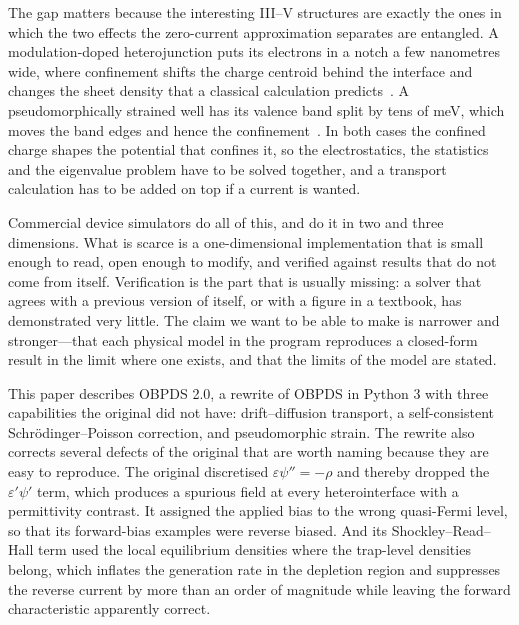 \documentclass[preprint,12pt]{elsarticle}
\begin{document}
The gap matters because the interesting III--V structures are exactly the ones
in which the two effects the zero-current approximation separates are
entangled. A modulation-doped heterojunction puts its electrons in a notch a
few nanometres wide, where confinement shifts the charge centroid behind the
interface and changes the sheet density that a classical calculation
predicts~\cite{Ando1982,Stern1972}. A pseudomorphically strained well has its
valence band split by tens of meV, which moves the band edges and hence the
confinement~\cite{Bir1974,Chuang1991}. In both cases the confined charge
shapes the potential that confines it, so the electrostatics, the statistics
and the eigenvalue problem have to be solved together, and a transport
calculation has to be added on top if a current is wanted.

Commercial device simulators do all of this, and do it in two and three
dimensions. What is scarce is a one-dimensional implementation that is small
enough to read, open enough to modify, and verified against results that do
not come from itself. Verification is the part that is usually missing: a
solver that agrees with a previous version of itself, or with a figure in a
textbook, has demonstrated very little. The claim we want to be able to make
is narrower and stronger---that each physical model in the program reproduces
a closed-form result in the limit where one exists, and that the limits of the
model are stated.

This paper describes OBPDS 2.0, a rewrite of OBPDS in Python 3 with three
capabilities the original did not have: drift--diffusion transport, a
self-consistent Schr\"odinger--Poisson correction, and pseudomorphic strain.
The rewrite also corrects several defects of the original that are worth
naming because they are easy to reproduce. The original discretised
$\varepsilon\psi''=-\rho$ and thereby dropped the $\varepsilon'\psi'$ term,
which produces a spurious field at every heterointerface with a permittivity
contrast. It assigned the applied bias to the wrong quasi-Fermi level, so that
its forward-bias examples were reverse biased. And its Shockley--Read--Hall
term used the local equilibrium densities where the trap-level densities
belong, which inflates the generation rate in the depletion region and
suppresses the reverse current by more than an order of magnitude while
leaving the forward characteristic apparently correct.
\end{document}
